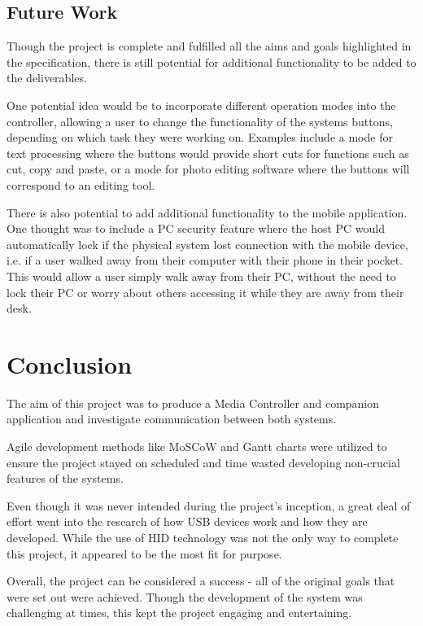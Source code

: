 \documentclass{article}
\begin{document}
		\subsection{Future Work}
			Though the project is complete and fulfilled all the aims and goals highlighted in the specification, there is still potential for additional functionality to be added to the deliverables.
			
			One potential idea would be to incorporate different operation modes into the controller, allowing a user to change the functionality of the systems buttons, depending on which task they were working on. Examples include a mode for text processing where the buttons would provide short cuts for functions such as cut, copy and paste, or a mode for photo editing software where the buttons will correspond to an editing tool.
			
			There is also potential to add additional functionality to the mobile application. One thought was to include a PC security feature where the host PC would automatically lock if the physical system lost connection with the mobile device, i.e. if a user walked away from their computer with their phone in their pocket. This would allow a user simply walk away from their PC, without the need to lock their PC or worry about others accessing it while they are away from their desk.
		
	
		
	\section{Conclusion}
		The aim of this project was to produce a Media Controller and companion application and investigate communication between both systems. 
		
		Agile development methods like MoSCoW and Gantt charts were utilized to ensure the project stayed on scheduled and time wasted developing non-crucial features of the systems. 
		
		Even though it was never intended during the project's inception, a great deal of effort went into the research of how USB devices work and how they are developed. While the use of HID technology was not the only way to complete this project, it appeared to be the most fit for purpose.
		
		Overall, the project can be considered a success - all of the original goals that were set out were achieved. Though the development of the system was challenging at times, this kept the project engaging and entertaining. 
		
\end{document}

